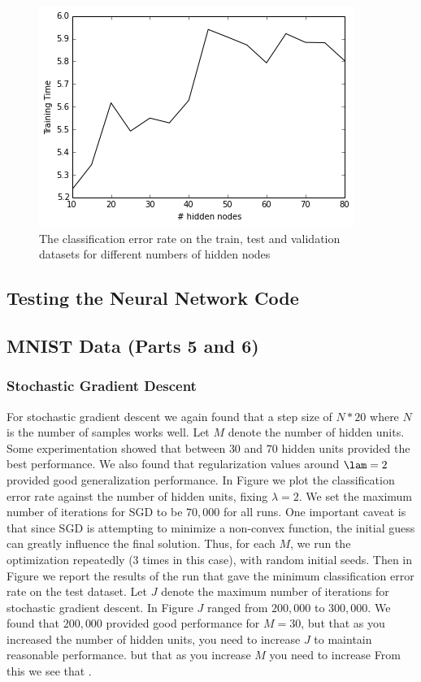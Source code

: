 \documentclass[10pt]{article}
\begin{document}
\begin{figure}
\centering
\includegraphics[scale=0.5]{SGD_toy_data_2_training_time.png}
\caption{The classification error rate on the train, test and validation datasets for different numbers of hidden nodes}
\label{SGD_toy_data_2_training_time}
\end{figure}

\subsection*{Testing the Neural Network Code}



\subsection*{MNIST Data (Parts 5 and 6)}

\subsubsection*{Stochastic Gradient Descent}
For stochastic gradient descent we again found that a step size of $N*20$ where $N$ is the number of samples works well. Let $M$ denote the number of hidden units. Some experimentation showed that between $30$ and $70$ hidden units provided the best performance. We also found that regularization values around $\lam = 2$ provided good generalization performance. In Figure  we plot the classification error rate against the number of hidden units, fixing $\lambda = 2$. We set the maximum number of iterations for SGD to be $70,000$ for all runs. One important caveat is that since SGD is attempting to minimize a non-convex function, the initial guess can greatly influence the final solution. Thus, for each $M$, we run the optimization repeatedly (3 times in this case), with random initial seeds. Then in Figure we report the results of the run that gave the minimum classification error rate on the test dataset. Let $J$ denote the maximum number of iterations for stochastic gradient descent. In Figure  $J$ ranged from $200,000$ to $300,000$. We found that $200,000$ provided good performance for $M = 30$, but that as you increased the number of hidden units, you need to increase $J$ to maintain reasonable performance.  but that as you increase $M$ you need to increase  From this we see that . 
\end{document}
